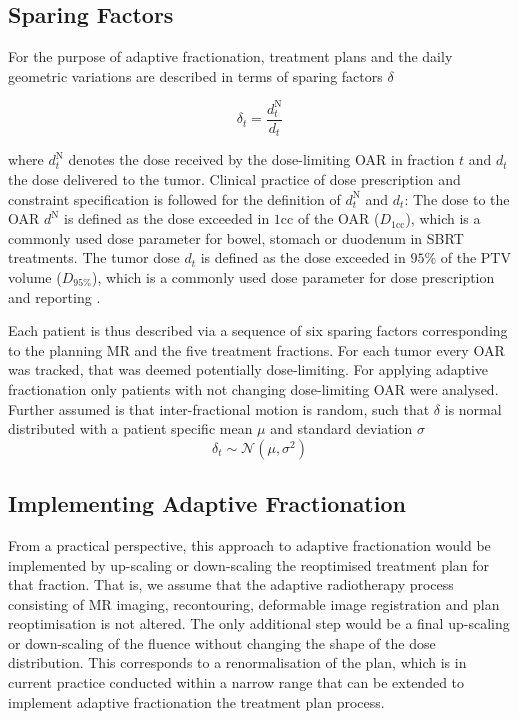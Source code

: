 \documentclass[\relativeRoot/ada.tex]{subfiles}
\begin{document}
\subsection{Sparing Factors}\label{sec:sparing_factors}
For the purpose of adaptive fractionation, treatment plans and the daily geometric variations are described in terms of sparing factors $\delta$

\begin{equation*}
    \delta_{t} = \frac{d_{t}^{\text{N}}}{d_{t}}
\end{equation*}

where $d_{t}^{\text{N}}$ denotes the dose received by the dose-limiting OAR in fraction $t$ and $d_{t}$ the dose delivered to the tumor. Clinical practice of dose prescription and constraint specification is followed for the definition of $d_{t}^{\text{N}}$ and $d_{t}$: The dose to the OAR $d^{\text{N}}$ is defined as the dose exceeded in $1$cc of the OAR ($D_{1\text{cc}}$), which is a commonly used dose parameter for bowel, stomach or duodenum in SBRT treatments. The tumor dose $d_{t}$ is defined as the dose exceeded in $95\%$ of the PTV volume ($D_{95\%}$), which is a commonly used dose parameter for dose prescription and reporting \cite{ICRU50}\cite{ICRU62}.

Each patient is thus described via a sequence of six sparing factors corresponding to the planning MR and the five treatment fractions. For each tumor every OAR was tracked, that was deemed potentially dose-limiting. For applying adaptive fractionation only patients with not changing dose-limiting OAR were analysed. Further assumed is that inter-fractional motion is random, such that $\delta$ is normal distributed with a patient specific mean $\mu$ and standard deviation $\sigma$
\begin{equation*}
\delta_t \sim \mathcal{N}(\mu,\sigma^2)
\end{equation*}

\subsection{Implementing Adaptive Fractionation}

From a practical perspective, this approach to adaptive fractionation would be implemented by up-scaling or down-scaling the reoptimised treatment plan for that fraction. That is, we assume that the adaptive radiotherapy process consisting of MR imaging, recontouring, deformable image registration and plan reoptimisation is not altered. The only additional step would be a final up-scaling or down-scaling of the fluence without changing the shape of the dose distribution. This corresponds to a renormalisation of the plan, which is in current practice conducted within a narrow range that can be extended to implement adaptive fractionation the treatment plan process.
\end{document}
